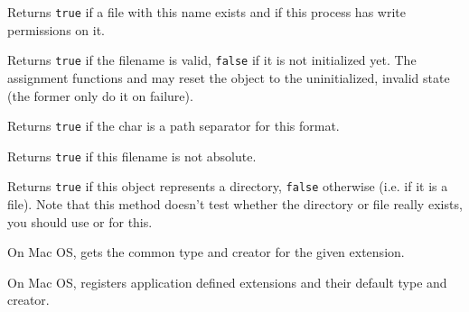 Returns {\tt true} if a file with this name exists and if this process has write permissions on it.


\label{wxfilenameisok}


Returns {\tt true} if the filename is valid, {\tt false} if it is not
initialized yet. The assignment functions and
 may reset the object to the uninitialized,
invalid state (the former only do it on failure).


\label{wxfilenameispathseparator}


Returns {\tt true} if the char is a path separator for this format.


\label{wxfilenameisrelative}


Returns {\tt true} if this filename is not absolute.


\label{wxfilenameisdir}


Returns {\tt true} if this object represents a directory, {\tt false} otherwise
(i.e. if it is a file). Note that this method doesn't test whether the
directory or file really exists, you should use 
 or 
 for this.

\label{wxfilenamemacfinddefaulttypeandcreator}


On Mac OS, gets the common type and creator for the given extension.

\label{wxfilenamemacregisterdefaulttypeandcreator}


On Mac OS, registers application defined extensions and their default type and creator.

